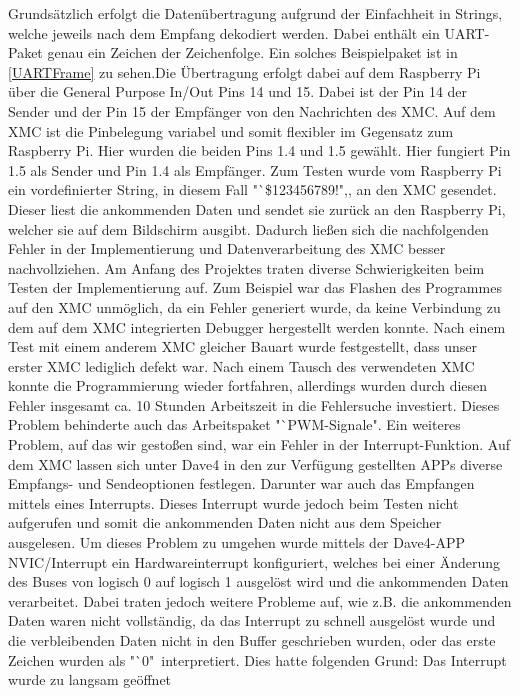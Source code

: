 \documentclass[12pt,a4paper,bibliography=totoc,listof=totoc]{scrartcl}
\begin{document}
Grundsätzlich erfolgt die Datenübertragung aufgrund der Einfachheit in Strings, welche jeweils nach dem 
Empfang dekodiert werden. Dabei enthält ein UART-Paket genau ein Zeichen der Zeichenfolge. Ein solches 
Beispielpaket ist in \ref{UARTFrame} zu sehen.Die Übertragung erfolgt dabei auf dem Raspberry Pi über 
die General Purpose In/Out Pins 14 und 15. Dabei ist der Pin 14 der Sender und der Pin 15 der Empfänger 
von den Nachrichten des XMC. Auf dem XMC ist die Pinbelegung variabel und somit flexibler im Gegensatz 
zum Raspberry Pi. Hier wurden die beiden Pins 1.4 und 1.5 gewählt. Hier fungiert Pin 1.5 als Sender und 
Pin 1.4 als Empfänger. Zum Testen wurde vom Raspberry Pi ein vordefinierter String, in diesem Fall 
"`\$123456789!",, an den XMC gesendet. Dieser liest die ankommenden Daten und sendet sie zurück an den 
Raspberry Pi, welcher sie auf dem Bildschirm ausgibt. Dadurch ließen sich die nachfolgenden Fehler in 
der Implementierung und Datenverarbeitung des XMC besser nachvollziehen. Am Anfang des Projektes traten diverse Schwierigkeiten 
beim Testen der Implementierung auf. Zum Beispiel war das Flashen des Programmes auf den XMC unmöglich, 
da ein Fehler generiert wurde, da keine Verbindung zu dem auf dem XMC integrierten Debugger hergestellt 
werden konnte. Nach einem Test mit einem anderem XMC gleicher Bauart wurde festgestellt, dass unser erster 
XMC lediglich defekt war. Nach einem Tausch des verwendeten XMC konnte die Programmierung wieder 
fortfahren, allerdings wurden durch diesen Fehler insgesamt ca. 10 Stunden Arbeitszeit in die Fehlersuche 
investiert. Dieses Problem behinderte auch das Arbeitspaket "`PWM-Signale".
Ein weiteres Problem, auf das wir gestoßen sind, war ein Fehler in der Interrupt-Funktion. Auf dem XMC 
lassen sich unter Dave4 in den zur Verfügung gestellten APPs diverse Empfangs- und Sendeoptionen festlegen. 
Darunter war auch das Empfangen mittels eines Interrupts. Dieses Interrupt wurde jedoch beim Testen nicht 
aufgerufen und somit die ankommenden Daten nicht aus dem Speicher ausgelesen. Um dieses Problem zu umgehen 
wurde mittels der Dave4-APP NVIC/Interrupt ein Hardwareinterrupt konfiguriert, welches bei einer Änderung 
des Buses von logisch 0 auf logisch 1 ausgelöst wird und die ankommenden Daten verarbeitet. Dabei traten 
jedoch weitere Probleme auf, wie z.B. die ankommenden Daten waren nicht vollständig, da das Interrupt zu 
schnell ausgelöst wurde und die verbleibenden Daten nicht in den Buffer geschrieben wurden, oder das erste 
Zeichen wurden als "`0" \,interpretiert. Dies hatte folgenden Grund: Das Interrupt wurde zu langsam geöffnet 
\end{document}
